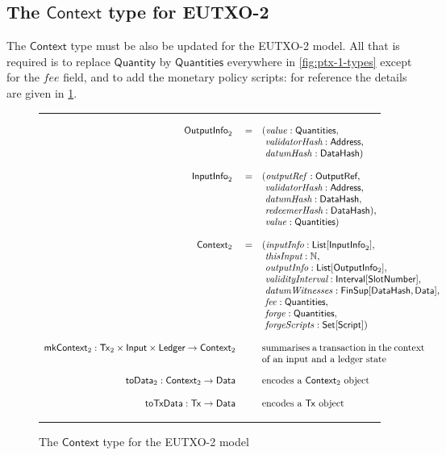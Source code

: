 \documentclass[a4paper]{article}
\renewcommand{\i}{\textit}  %
\newcommand{\s}{\textsf}  %
\newcommand{\msf}[1]{\ensuremath{\mathsf{#1}}}
\newcommand{\mi}[1]{\ensuremath{\mathit{#1}}}
\newcommand\rfskip{7pt}
\newenvironment{ruledfigure}[1]{\begin{figure}[#1]\hrule\vspace{\rfskip}}{\vspace{\rfskip}\hrule\end{figure}}
\newcommand{\List}[1]{\ensuremath{\s{List}[#1]}}
\newcommand{\Set}[1]{\ensuremath{\s{Set}[#1]}}
\newcommand{\Interval}[1]{\ensuremath{\s{Interval}[#1]}}
\newcommand{\FinSup}[2]{\ensuremath{\s{FinSup}[#1,#2]}}
\newcommand{\script}{\ensuremath{\s{Script}}}
\newcommand{\ctx}{\ensuremath{\s{Context}}}
\newcommand{\toData}{\ensuremath{\s{toData}}}
\newcommand{\toTxData}{\ensuremath{\s{toTxData}}}
\newcommand{\mkContext}{\ensuremath{\s{mkContext}}}
\newcommand{\Address}{\ensuremath{\s{Address}}}
\newcommand{\DataHash}{\ensuremath{\s{DataHash}}}
\newcommand{\forge}{\mi{forge}}
\newcommand{\forgeScripts}{\mi{forgeScripts}}
\newcommand{\fee}{\mi{fee}}
\newcommand{\val}{\mi{value}}  %
\newcommand{\datumHash}{\mi{datumHash}}
\newcommand{\datumWits}{\mi{datumWitnesses}}
\newcommand{\Data}{\ensuremath{\s{Data}}}
\newcommand{\outputref}{\mi{outputRef}}
\newcommand{\slotnum}{\ensuremath{\s{SlotNumber}}}
\newcommand{\eutxotx}{\msf{Tx}}
\newcommand{\qty}{\ensuremath{\s{Quantity}}}
\newcommand{\qtymap}{\ensuremath{\s{Quantities}}}
\newcommand\N{\ensuremath{\mathbb{N}}}
\begin{document}
\subsection{The \ctx{} type for EUTXO-2}
\label{sec:pendingtx-2}
The \ctx{} type must be also be updated for the EUTXO-2 model.  All
that is required is to replace \qty{} by \qtymap{} everywhere in
\cref{fig:ptx-1-types} except for the \fee{} field, and to add the
monetary policy scripts: for reference the details are given in
\cref{fig:ptx-2-types}.
\begin{ruledfigure}{H}
  \begin{displaymath}
  \begin{array}{rll}
    \s{OutputInfo}_2\s{ } &=&(\val: \qtymap,\\
                          & &\ \i{validatorHash}: \Address,\\
                          & &\ \datumHash: \DataHash)\\
    \\
    \s{InputInfo}_2\s{ } &=& (\outputref: \s{OutputRef},\\
                         & &\ \i{validatorHash}: \Address,\\
                         & &\ \i{datumHash}: \DataHash,\\
                         & &\ \i{redeemerHash}: \DataHash),\\
                         & &\ \val: \qtymap)\\
     \\
     \ctx_2\s{ } &=&(\i{inputInfo}: \List{\s{InputInfo}_2},\\
                 & &\ \i{thisInput}: \N,\\
                 & &\ \i{outputInfo}: \List{\s{OutputInfo$_2$}},\\
                 & &\ \i{validityInterval}: \Interval{\slotnum},\\
                 & &\ \datumWits: \FinSup{\DataHash}{\Data},\\
                 & &\ \fee: \qtymap,\\
                 & &\ \forge: \qtymap,\\
                 & &\ \forgeScripts: \Set{\script})\\
    \\
    \mkContext_2: \eutxotx_2 \times \s{Input} \times \s{Ledger} \rightarrow \ctx_2 &&
      \mbox{\parbox[t]{6cm}{summarises a transaction in the context of an input and a ledger state}}\\
     \\
     \toData_2: \ctx_2 \rightarrow \Data &~& \mbox{encodes a $\ctx_2$ object}\\
     \\
     \toTxData : \eutxotx \rightarrow \Data &~& \mbox{encodes a $\eutxotx$ object}
  \end{array}
  \end{displaymath}
  \caption{The \ctx{} type for the EUTXO-2 model}
  \label{fig:ptx-2-types}
\end{ruledfigure}
\end{document}

